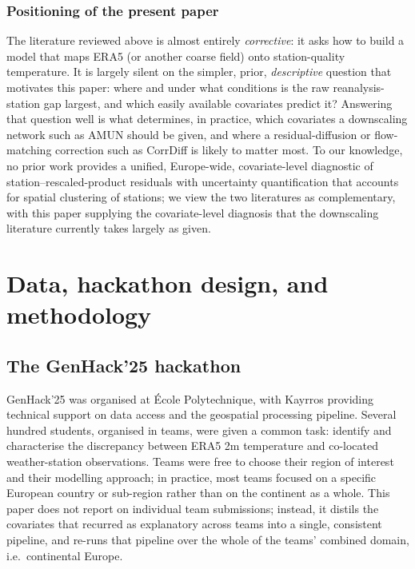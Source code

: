 \documentclass[a4paper,12pt,leqno]{article}
\begin{document}
\subsubsection{Positioning of the present paper}
\label{sec:related-diagnostics}

The literature reviewed above is almost entirely \emph{corrective}: it
asks how to build a model that maps ERA5 (or another coarse field) onto
station-quality temperature. It is largely silent on the simpler, prior,
\emph{descriptive} question that motivates this paper: where and under
what conditions is the raw reanalysis-station gap largest, and which
easily available covariates predict it? Answering that question well is
what determines, in practice, which covariates a downscaling network such
as AMUN should be given, and where a residual-diffusion or
flow-matching correction such as CorrDiff is likely to matter most. To
our knowledge, no prior work provides a unified, Europe-wide,
covariate-level diagnostic of station--rescaled-product residuals with
uncertainty quantification that accounts for spatial clustering of
stations; we view the two literatures as complementary, with this paper
supplying the covariate-level diagnosis that the downscaling literature
currently takes largely as given.

\section{Data, hackathon design, and methodology}
\label{sec:data}

\subsection{The GenHack'25 hackathon}

GenHack'25 was organised at \'Ecole Polytechnique, with Kayrros
providing technical support on data access and the geospatial processing
pipeline. Several hundred students, organised in teams, were given a
common task: identify and characterise the discrepancy between ERA5 2m
temperature and co-located weather-station observations. Teams were free
to choose their region of interest and their modelling approach; in
practice, most teams focused on a specific European country or
sub-region rather than on the continent as a whole. This paper does not
report on individual team submissions; instead, it distils the
covariates that recurred as explanatory across teams into a single,
consistent pipeline, and re-runs that pipeline over the whole of the
teams' combined domain, i.e.\ continental Europe.
\end{document}
